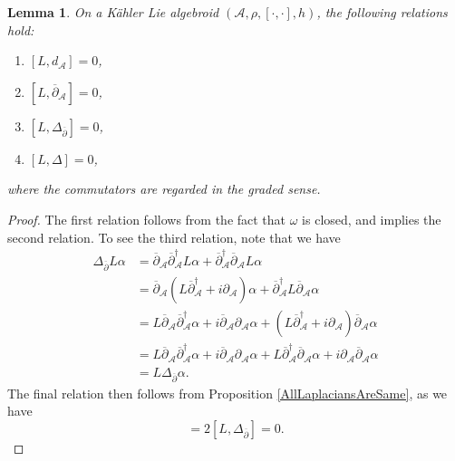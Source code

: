 \documentclass[10pt,a4paper]{amsart}
\newtheorem{lemma}{Lemma}
\newcommand{\A}{\mathcal{A}}
\newcommand{\p}{\partial}
\begin{document}
\begin{lemma}
    On a Kähler Lie algebroid $(\A, \rho, [\cdot, \cdot],h)$, the following relations hold:
    \begin{enumerate}
        \item $[L,d_\A]=0$,
        \item $[L,\overline{\p}_\A]=0$,
        \item $[L,\Delta_{\overline{\p}}]=0$, 
        \item $[L,\Delta]=0$,
    \end{enumerate}
    where the commutators are regarded in the graded sense.
\end{lemma}

\begin{proof}
    The first relation follows from the fact that $\omega$ is closed, and implies the second relation.  To see the third relation, note that we have
    \begin{align*}
        \Delta_{\overline{\p}}L \alpha &= \overline{\p}_\A\overline{\p}^\dagger_\A L \alpha +  \overline{\p}^\dagger_\A\overline{\p}_\A L\alpha  \\
        &=\overline{\p}_\A(L \overline{\p}_\A^\dagger +i \p_\A)\alpha + \overline{\p}_\A^\dagger L\overline{\p}_\A\alpha \\
        &=L\overline{\p}_\A \overline{\p}_\A^\dagger \alpha + i\overline{\p}_\A\p_\A \alpha + (L \overline{\p}^\dagger_\A+ i\p_\A) \overline{\p}_\A\alpha \\
        &= L\overline{\p}_\A \overline{\p}_\A^\dagger \alpha + i \overline{\p}_\A \p_\A \alpha + L \overline{\p}_\A^\dagger \overline{\p}_\A \alpha + i \p_\A \overline{\p}_\A \alpha \\
        &=L \Delta_{\overline{\p}}\alpha.
    \end{align*}
    The final relation then follows from Proposition \ref{AllLaplaciansAreSame}, as we have
    \begin{equation*}
        [L,\Delta] =2[L,\Delta_{\overline{\p}}]=0.
    \end{equation*}
\end{proof}
\end{document}
